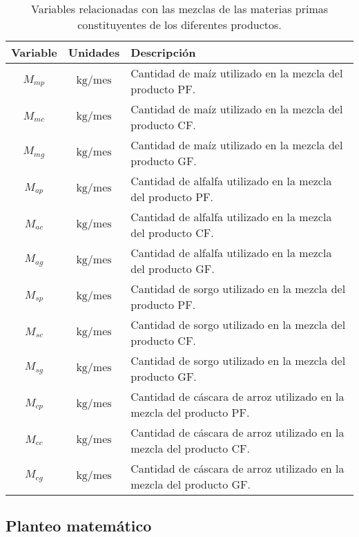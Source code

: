 \documentclass[a4paper,11pt]{article}
\begin{document}
\begin{table}[h!t]
  \centering
  \begin{tabular}{ | c | c | p{7cm} | }
    \hline
    \textbf{Variable} & \textbf{Unidades}          & \textbf{Descripción} \\ \hline
           \(M_{mp}\) & \(\text{kg} / \text{mes}\) & Cantidad de maíz utilizado en la mezcla del producto PF. \\ \hline
           \(M_{mc}\) & \(\text{kg} / \text{mes}\) & Cantidad de maíz utilizado en la mezcla del producto CF. \\ \hline
           \(M_{mg}\) & \(\text{kg} / \text{mes}\) & Cantidad de maíz utilizado en la mezcla del producto GF. \\ \hline
           \(M_{ap}\) & \(\text{kg} / \text{mes}\) & Cantidad de alfalfa utilizado en la mezcla del producto PF. \\ \hline
           \(M_{ac}\) & \(\text{kg} / \text{mes}\) & Cantidad de alfalfa utilizado en la mezcla del producto CF. \\ \hline
           \(M_{ag}\) & \(\text{kg} / \text{mes}\) & Cantidad de alfalfa utilizado en la mezcla del producto GF. \\ \hline
           \(M_{sp}\) & \(\text{kg} / \text{mes}\) & Cantidad de sorgo utilizado en la mezcla del producto PF. \\ \hline
           \(M_{sc}\) & \(\text{kg} / \text{mes}\) & Cantidad de sorgo utilizado en la mezcla del producto CF. \\ \hline
           \(M_{sg}\) & \(\text{kg} / \text{mes}\) & Cantidad de sorgo utilizado en la mezcla del producto GF. \\ \hline
           \(M_{cp}\) & \(\text{kg} / \text{mes}\) & Cantidad de cáscara de arroz utilizado en la mezcla del producto PF. \\ \hline
           \(M_{cc}\) & \(\text{kg} / \text{mes}\) & Cantidad de cáscara de arroz utilizado en la mezcla del producto CF. \\ \hline
           \(M_{cg}\) & \(\text{kg} / \text{mes}\) & Cantidad de cáscara de arroz utilizado en la mezcla del producto GF. \\ \hline
  \end{tabular}
  \caption{Variables relacionadas con las mezclas de las materias primas constituyentes de los diferentes productos.}
\end{table}

\FloatBarrier

\subsection{Planteo matemático}
\end{document}
